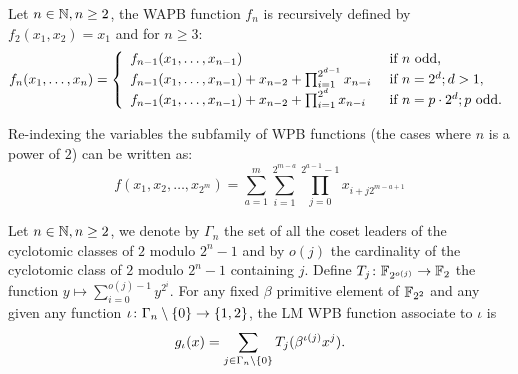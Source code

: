 \documentclass{llncs}
\begin{document}
\begin{definition}\label{def:CMR}
	Let $n \in \mathbb{N}, n\ge 2$, the WAPB function $f_n$ is recursively defined by $f_2(x_1,x_2)=x_1$ and for $n\geq 3$:
	\[f_n(x_1,\dots ,x_n)= \left \{
	\begin{array}{l l}
	f_{n-1}(x_1,\dots ,x_{n-1})   & \text{ if } n \text{ odd, } \\
	f_{n-1}(x_1,\dots ,x_{n-1})+x_{n-2}+  \prod_{i=1}^{2^{d-1}} x_{n-i}  & \text{ if } n=2^d; d>1, \\
	f_{n-1}(x_1,\dots ,x_{n-1})+x_{n-2}+  \prod_{i=1}^{2^d} x_{n-i} & \text{ if } n=p\cdot2^d; p\text{ odd}.
	\end{array}
	\right .\]
	
	Re-indexing the variables the subfamily of WPB functions (the cases where $n$ is a power of $2$) can be written as:
	\[f(x_1, x_2, \dots, x_{2^m})=\sum_{a=1}^{m} \sum_{i=1}^{2^{m-a}} \prod_{j=0}^{2^{a-1}-1} x_{i+j2^{m-a+1}}\]
\end{definition}




%	



\begin{definition}\label{def:LM}
	Let $n \in \mathbb{N}, n\ge 2$, we denote by $\Gamma_n$ the set of all the coset leaders of the cyclotomic classes  of $2$ modulo $2^n- 1$ and by  $o(j)$  the cardinality of the cyclotomic class of $2$ modulo $2^n- 1$ containing $j$.
	Define $T_j\colon \mathbb{F}_{2^{o(j)}}\rightarrow \mathbb{F}_{2}$ the function $y \mapsto \sum_{i=0}^{o(j)-1} y^{2^i}$. 
	For any fixed $\beta$ primitive element of $\mathbb{F}_{2^2}$ and any given any function $\iota\colon \Gamma_n\setminus\left\{0\right\} \rightarrow \left\{1,2\right\} $, the LM WPB function associate to $\iota$ is   
	\[
	g_\iota (x) = \sum_{j\in\Gamma_n\setminus\left\{0\right\} } T_j(\beta^{\iota(j)} x^j).
	\]
\end{definition}
\end{document}

